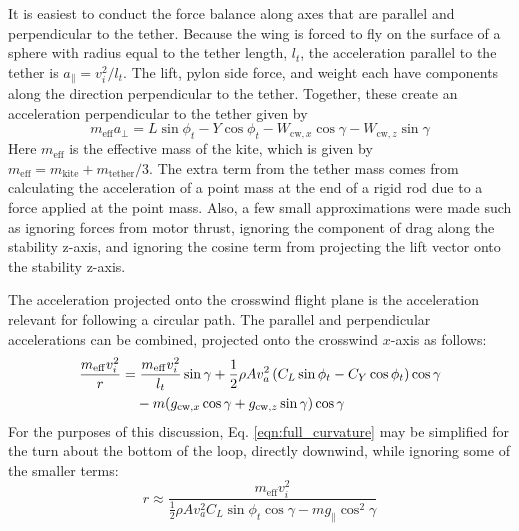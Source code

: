 \documentclass[11pt]{amsart}
\newcommand{\app}{a}
\newcommand{\cw}{\mathrm{cw}}
\newcommand{\eff}{\mathrm{eff}}
\newcommand{\kite}{\mathrm{kite}}
\begin{document}
{It is easiest to conduct the force balance along axes that are
parallel and perpendicular to the tether.  Because the wing is forced
to fly on the surface of a sphere with radius equal to the tether
length, $l_t$, the acceleration parallel to the tether is
$a_{\parallel} = v_i^2/l_t$.  The lift, pylon side force, and weight
each have components along the direction perpendicular to the tether.
Together, these create an acceleration perpendicular to the tether
given by
%
\begin{equation}
m_{\eff} a_{\bot} = L \sin \phi_t - Y \cos \phi_t -
W_{\cw, x} \cos \gamma - W_{\cw, z} \sin \gamma
\end{equation}
%
Here $m_{\eff}$ is the effective mass of the kite, which is given by
$m_{\eff} = m_{\kite} + m_{\mathrm{tether}} / 3$.  The extra term from
the tether mass comes from calculating the acceleration of a point
mass at the end of a rigid rod due to a force applied at the point
mass.  Also, a few small approximations were made such as ignoring
forces from motor thrust, ignoring the component of drag along the
stability z-axis, and ignoring the cosine term from projecting the
lift vector onto the stability z-axis.

The acceleration projected onto the crosswind flight plane is the
acceleration relevant for following a circular path.  The parallel and
perpendicular accelerations can be combined, projected onto the
crosswind $x$-axis as follows:
%
\begin{align}
  \label{eqn:full_curvature}
  \frac{m_{\eff} v_i^2}{r} =&\;
    \frac{m_{\eff} v_i^2}{l_t} \sin \gamma +
    \frac{1}{2} \rho A v_{\app}^2 \left(C_L \sin \phi_t - C_Y \cos \phi_t \right) \cos \gamma \\ \notag
  & - m (g_{\cw,x} \cos \gamma +
  g_{\cw,z} \sin \gamma) \cos \gamma
\end{align}
%
For the purposes of this discussion, Eq. \ref{eqn:full_curvature} may
be simplified for the turn about the bottom of the loop, directly
downwind, while ignoring some of the smaller terms:
%
\begin{equation}
  r \approx \frac{m_{\eff} v_i^2}
                 {\frac{1}{2} \rho A v_{\app}^2 C_L \sin \phi_t \cos \gamma -
                 m g_{\parallel} \cos^2 \gamma}
\end{equation}


}
\end{document}

